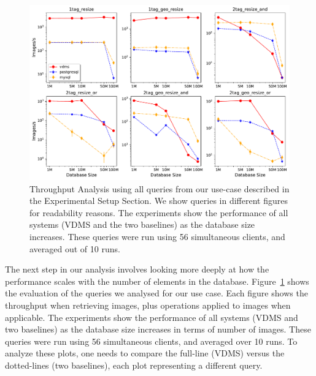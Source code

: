 \begin{figure}[ht]
\includegraphics[width=\columnwidth]{figures/plot_th_56_mosaic_results_throughput}
\caption{Throughput Analysis using all queries from our use-case
described in the Experimental Setup Section.
We show queries in different figures for readability reasons.
The experiments show the performance of all systems (VDMS and the two baselines) as the
database size increases.
These queries were run using 56 simultaneous clients,
and averaged out of 10 runs.}
\label{fig:q_throughput_56}
\end{figure}

The next step in our analysis involves looking more deeply at how
the performance scales with the number of elements in the database.
Figure~\ref{fig:q_throughput_56} shows the evaluation of the
queries we analysed for our use case.
Each figure shows the throughput when retrieving images,
plus operations applied to images when applicable.
The experiments show the performance of all systems (VDMS and two baselines) as the
database size increases in terms of number of images.
These queries were run using 56 simultaneous clients,
and averaged over 10 runs.
To analyze these plots, one needs to compare the full-line (VDMS) versus the
dotted-lines (two baselines), each plot representing a different query.

